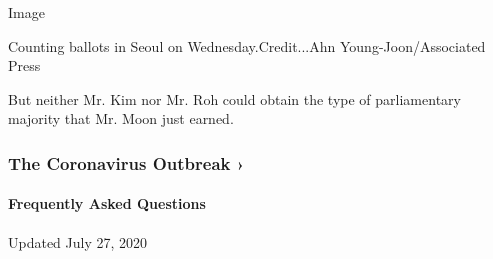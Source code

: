 Image

Counting ballots in Seoul on Wednesday.Credit...Ahn
Young-Joon/Associated Press

But neither Mr. Kim nor Mr. Roh could obtain the type of parliamentary
majority that Mr. Moon just earned.

\href{https://www.nytimes3xbfgragh.onion/news-event/coronavirus?action=click\&pgtype=Article\&state=default\&region=MAIN_CONTENT_3\&context=storylines_faq}{}

\hypertarget{the-coronavirus-outbreak-}{%
\subsubsection{The Coronavirus Outbreak
›}\label{the-coronavirus-outbreak-}}

\hypertarget{frequently-asked-questions}{%
\paragraph{Frequently Asked
Questions}\label{frequently-asked-questions}}

Updated July 27, 2020

